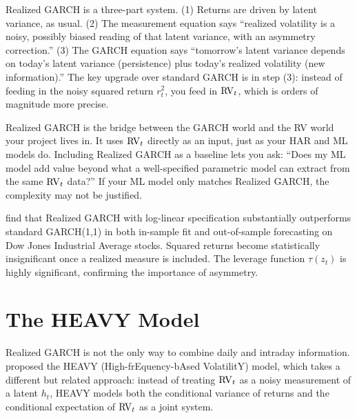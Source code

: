 \begin{intuition}
Realized GARCH is a three-part system. (1) Returns are driven by latent variance, as
usual. (2) The measurement equation says ``realized volatility is a noisy, possibly
biased reading of that latent variance, with an asymmetry correction.'' (3) The
GARCH equation says ``tomorrow's latent variance depends on today's latent variance
(persistence) plus today's realized volatility (new information).'' The key upgrade
over standard GARCH is in step (3): instead of feeding in the noisy squared return
$r^2_t$, you feed in $\operatorname{RV}_t$, which is orders of magnitude more precise.
\end{intuition}

\begin{projectconnection}
Realized GARCH is the bridge between the GARCH world and the RV world your project
lives in. It uses $\operatorname{RV}_t$ directly as an input, just as your HAR and ML models do.
Including Realized GARCH as a baseline lets you ask: ``Does my ML model add value
beyond what a well-specified parametric model can extract from the same $\operatorname{RV}_t$
data?'' If your ML model only matches Realized GARCH, the complexity may not be
justified.
\end{projectconnection}

\begin{keyresult}
\citet{hansen2012realized} find that Realized GARCH with log-linear specification
substantially outperforms standard GARCH(1,1) in both in-sample fit and
out-of-sample forecasting on Dow Jones Industrial Average stocks. Squared returns
become statistically insignificant once a realized measure is included. The leverage
function $\tau(z_t)$ is highly significant, confirming the importance of asymmetry.
\end{keyresult}


\section{The HEAVY Model}
\label{sec:heavy}

Realized GARCH is not the only way to combine daily and intraday information.
\citet{shephard2010heavy} proposed the HEAVY (High-frEquency-bAsed VolatilitY)
model, which takes a different but related approach: instead of treating $\operatorname{RV}_t$ as
a noisy measurement of a latent $h_t$, HEAVY models both the conditional variance of
returns and the conditional expectation of $\operatorname{RV}_t$ as a joint system.

